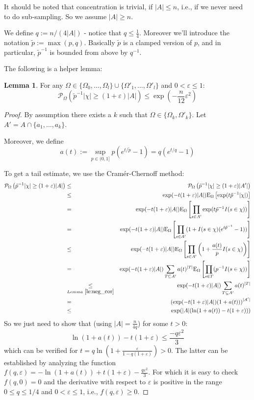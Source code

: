 \documentclass{article}
\newcommand{\prob}{\mathcal P}
\newcommand{\expectation}{\mathrm{E}}
\newcommand{\eps}{\varepsilon}
\theoremstyle{definition}
\newtheorem{lemma}{Lemma}
\begin{document}
It should be noted that concentration is trivial, if $|A| \leq n$, i.e., if we never need to do sub-sampling.
So we assume $|A| \geq n$.

We define $q := n/(4|A|)$ - notice that $q \leq \frac{1}{4}$. Moreover we'll introduce the notation $\tilde{p} := \max(p,q)$.
Basically $\tilde{p}$ is a clamped version of $p$, and in particular, $\tilde{p}^{-1}$ is bounded from above by $q^{-1}$.

The following is a helper lemma:
\begin{lemma}
\label{le:helper}
For any $\Omega \in \{\Omega_0,\ldots,\Omega_l\} \cup \{\Omega'_1,\ldots,\Omega'_l\}$ and $0 < \eps \leq 1$:
\[
\prob_{\Omega} \left( \tilde{p}^{-1} |\chi| \geq (1+\eps) |A| \right) \leq \exp\left(-\frac{n}{12} \eps^2\right)
\]
\end{lemma}
\begin{proof}
By assumption there exists a $k$ such that $\Omega \in \{\Omega_k, \Omega'_k\}$. Let $A' = A \cap \{a_1,\ldots,a_k\}$.

Moreover, we define
\[
  a(t) := \sup_{p \in (0,1]} p (e^{t/ \tilde{p}}-1) = q (e^{t/q}-1)
\]

To get a tail estimate, we use the Cram\'{e}r-Chernoff method:
{\allowdisplaybreaks
\begin{eqnarray*}
  \prob_{\Omega} \left( \tilde{p}^{-1} |\chi| \geq (1+\eps) |A| \right) & \leq & \prob_{\Omega} \left( \tilde{p}^{-1} |\chi| \geq (1+\eps) |A'| \right) \\
  & \leq & \exp( -t (1+\eps) |A| ) \expectation_\Omega \left[ \exp ( t \tilde{p}^{-1} |\chi| ) \right] \\
 & = & \exp( -t (1+\eps) |A| ) \expectation_\Omega \left[ \prod_{s \in A'} \exp ( t \tilde{p}^{-1} I(s \in \chi) ) \right] \\
  & = & \exp( -t (1+\eps) |A| ) \expectation_\Omega \left[ \prod_{s \in A'} (1 + I(s \in \chi) (e^{t \tilde{p}^{-1}}-1) ) \right] \\
 & \leq & \exp( -t (1+\eps) |A| ) \expectation_\Omega \left[ \prod_{s \in A'} \left(1 + \frac{a(t)}{p} I(s \in \chi) \right) \right] \\
 & = & \exp( -t (1+\eps) |A| ) \sum_{T \subseteq A'} a(t)^{|T|} \expectation_\Omega \left[ \prod_{s \in T} (p^{-1} I(s \in \chi) ) \right] \\
 & \underset{Lemma~\ref{le:neg_cor}}{\leq} & \exp( -t (1+\eps) |A| ) \sum_{T \subseteq A'} a(t)^{|T|} \\
 & = & \left(\exp( -t (1+\eps) |A| ) (1+a(t))\right)^{|A'|} \\ & \leq & \exp ( |A| (\ln(1+a(t))-t (1+\eps)))
\end{eqnarray*}}
So we just need to show that (using $|A|=\frac{n}{4q}$) for some $t > 0$:
\[
  \ln(1+a(t))-t (1+\eps) \leq \frac{-q \eps^2}{3}
\]
which can be verified for $t = q \ln ( 1 + \frac{\eps}{1-q(1+\eps)}) > 0$.
The latter can be established by analyzing the function $f(q,\eps) = -\ln (1+a(t)) +t (1+\eps) - \frac{q\eps^2}{3}$.
For which it is easy to check $f(q,0) = 0$ and the derivative with respect to $\eps$ is positive in the range $0 \leq q \leq 1/4$ and $0 < \eps \leq 1$, i.e.,
$f(q,\eps) \geq 0$.
\end{proof}
\end{document}
